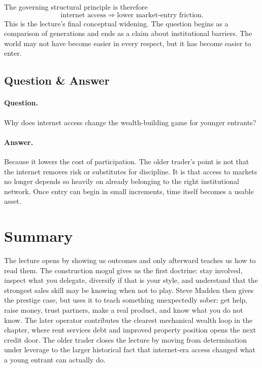The governing structural principle is therefore
\begin{equation}
\text{internet access} \Rightarrow \text{lower market-entry friction}.
\end{equation}
This is the lecture's final conceptual widening. The question begins as a comparison of generations and ends as a claim about institutional barriers. The world may not have become easier in every respect, but it has become easier to enter.

\subsection{Question \& Answer}

\paragraph{Question.} Why does internet access change the wealth-building game for younger entrants?

\paragraph{Answer.} Because it lowers the cost of participation. The older trader's point is not that the internet removes risk or substitutes for discipline. It is that access to markets no longer depends so heavily on already belonging to the right institutional network. Once entry can begin in small increments, time itself becomes a usable asset.

\section{Summary}

The lecture opens by showing us outcomes and only afterward teaches us how to read them. The construction mogul gives us the first doctrine: stay involved, inspect what you delegate, diversify if that is your style, and understand that the strongest sales skill may be knowing when not to play. Steve Madden then gives the prestige case, but uses it to teach something unexpectedly sober: get help, raise money, trust partners, make a real product, and know what you do not know. The later operator contributes the clearest mechanical wealth loop in the chapter, where rent services debt and improved property position opens the next credit door. The older trader closes the lecture by moving from determination under leverage to the larger historical fact that internet-era access changed what a young entrant can actually do.

